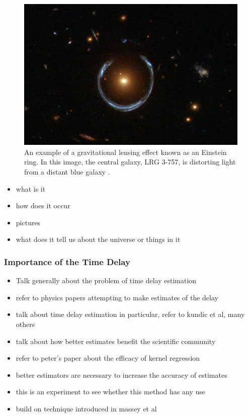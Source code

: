 \documentclass[a4paper,11pt]{article}
\begin{document}
\begin{figure}
\centering
\includegraphics[width=\textwidth]{einstein_ring}
\caption{An example of a gravitational lensing effect known as an Einstein ring.
In this image, the central galaxy, LRG 3-757, is distorting light from a distant
blue galaxy \cite{einsteinring}.}
\label{fig:einsteinring}
\end{figure}
\begin{itemize}
\item what is it
\item how does it occur
\item pictures
\item what does it tell us about the universe or things in it
\end{itemize}
\subsubsection{Importance of the Time Delay}
\label{sec-2-1-1}

\begin{itemize}
\item Talk generally about the problem of time delay estimation
\item refer to physics papers attempting to make estimates of the delay
\item talk about time delay estimation in particular, refer to kundic et al, many others
\item talk about how better estimates benefit the scientific community
\item refer to peter's paper about the efficacy of kernel regression
\item better estimators are necessary to increase the accuracy of estimates
\item this is an experiment to see whether this method has any use
\item build on technique introduced in massey et al
\end{itemize}
\end{document}
